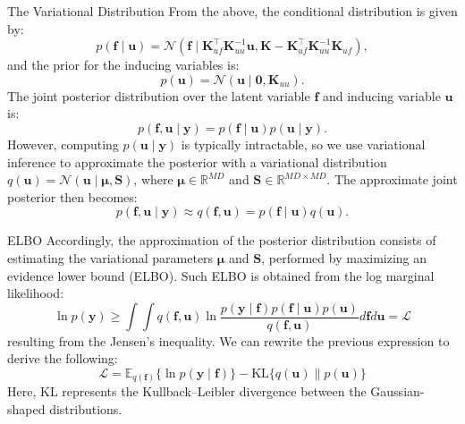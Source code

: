 \begin{frame}{The Variational Distribution}
	From the above, the conditional distribution is given by:
	\begin{equation}
	p(\mathbf{f} \mid \mathbf{u}) = \mathcal{N}\left( \mathbf{f} \mid \mathbf{K}_{uf}^\top \mathbf{K}_{uu}^{-1} \mathbf{u}, \mathbf{K} - \mathbf{K}_{uf}^\top \mathbf{K}_{uu}^{-1} \mathbf{K}_{uf}\right),
	\end{equation}
	and the prior for the inducing variables is:
	\begin{equation}
	p(\mathbf{u}) = \mathcal{N}\left(\mathbf{u} \mid \mathbf{0}, \mathbf{K}_{uu} \right).
	\end{equation}
	The joint posterior distribution over the latent variable $\mathbf{f}$ and inducing variable $\mathbf{u}$ is:
	\begin{equation}
	p(\mathbf{f}, \mathbf{u} \mid \mathbf{y}) = p(\mathbf{f} \mid \mathbf{u}) p(\mathbf{u} \mid \mathbf{y}).
	\end{equation}
	However, computing $p(\mathbf{u} \mid \mathbf{y})$ is typically intractable, so we use variational inference to approximate the posterior with a variational distribution $q(\mathbf{u}) = \mathcal{N}\left( \mathbf{u} \mid \boldsymbol{\mu}, \boldsymbol{S} \right)$, where $\boldsymbol{\mu} \in \mathbb{R}^{MD}$ and $\boldsymbol{S} \in \mathbb{R}^{MD \times MD}$. The approximate joint posterior then becomes:
	\begin{equation}\label{eq:so_join_posterior}
	p(\mathbf{f}, \mathbf{u} \mid \mathbf{y}) \approx q(\mathbf{f}, \mathbf{u}) = p(\mathbf{f} \mid \mathbf{u}) q(\mathbf{u}).
	\end{equation}
	
\end{frame}

\begin{frame}{ELBO}
	Accordingly, the approximation of the posterior distribution consists of estimating the variational parameters $\boldsymbol{\mu}$ and $\boldsymbol{S}$, performed by maximizing an evidence lower bound (ELBO). Such ELBO is obtained from the log marginal likelihood:
	\begin{equation}
	\ln p(\mathbf{y}) \geq \int \int q(\mathbf{f}, \mathbf{u}) \ln \frac{p(\mathbf{y} \mid \mathbf{f}) p(\mathbf{f}\mid \mathbf{u}) p(\mathbf{u})}{q(\mathbf{f}, \mathbf{u})} d\mathbf{f} d\mathbf{u} = \mathcal{L}
	\end{equation}
	resulting from the Jensen's inequality. We can rewrite the previous expression to derive the following:
	\begin{equation}
	\mathcal{L} = \mathbb{E}_{q(\mathbf{f})}\{\ln p(\mathbf{y} \mid \mathbf{f})\} - \text{KL}\{q(\mathbf{u})\parallel p(\mathbf{u})\}
	\end{equation}
	Here, $\text{KL}$ represents the Kullback--Leibler divergence between the Gaussian-shaped distributions.
\end{frame}

